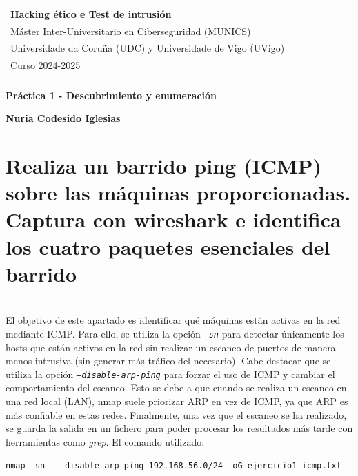 \documentclass[a4paper,12pt]{article} %
\begin{document}
 \thispagestyle{empty}  

\begin{tabular}{p{15.5cm}}  
{\large \bf Hacking ético e Test de intrusión} \\ Máster Inter-Universitario en Ciberseguridad (MUNICS)  
 \\  Universidade da Coruña (UDC) y Universidade de Vigo (UVigo)\\ Curso 2024-2025  \\
\hline    
\\
\end{tabular}  
\vspace*{0.3cm}  

\begin{center}  
	{\Large \bf Práctica 1 - Descubrimiento y enumeración 
} %
	\vspace{2mm}
	
	{\bf Nuria Codesido Iglesias} %
		
\end{center}  

\vspace{0.4cm}


\section{Realiza un barrido ping (ICMP) sobre las máquinas proporcionadas. Captura con wireshark e identifica los cuatro paquetes esenciales del barrido}
\\
    El objetivo de este apartado es identificar qué máquinas están activas en la red mediante ICMP. Para ello, se utiliza la opción \textit{\texttt{-sn}} para detectar únicamente los hosts que están activos en la red sin realizar un escaneo de puertos de manera menos intrusiva (sin generar más tráfico del necesario). Cabe destacar que se utiliza la opción \textit{\texttt{--disable-arp-ping}} para forzar el uso de ICMP y cambiar el comportamiento del escaneo. Esto se debe a que cuando se realiza un escaneo en una red local (LAN), nmap suele priorizar ARP en vez de ICMP, ya que ARP es más confiable en estas redes. Finalmente, una vez que el escaneo se ha realizado, se guarda la salida en un fichero para poder procesar los resultados más tarde con herramientas como \textit{grep}. El comando utilizado: 
    \begin{center}
    \texttt{nmap -sn - -disable-arp-ping 192.168.56.0/24 -oG ejercicio1\_icmp.txt}
    \end{center}
\end{document}
